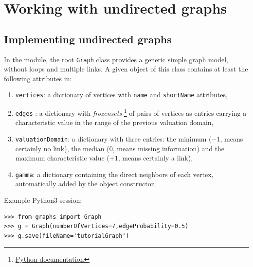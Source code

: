\chapter{Working with undirected graphs}
\label{sec:22}

\abstract*{}

\abstract{}

\section{Implementing undirected graphs}
\label{sec:22.1}

In the  module, the root \texttt{Graph} class provides a generic simple graph model, without loops and multiple links. A given object of this class contains at least the following attributes in:
\begin{enumerate}
\item \texttt{vertices}: a dictionary of vertices with \texttt{name} and \texttt{shortName} attributes,
\item \texttt{edges} : a dictionary with \emph{frozensets} \footnote{\href{https://docs.python.org/3.9/library/stdtypes.html?highlight=frozenset\#frozenset}{Python documentation}} of pairs of vertices as entries carrying a characteristic value in the range of the previous valuation domain,
\item \texttt{valuationDomain}: a dictionary with three entries: the minimum ($-1$, means certainly no link), the median ($0$, means missing information) and the maximum characteristic value ($+1$, means certainly a link),
\item \texttt{gamma}: a dictionary containing the direct neighbors of each vertex, automatically added by the object constructor.
\end{enumerate}

Example Python3 session:
\begin{lstlisting}
>>> from graphs import Graph
>>> g = Graph(numberOfVertices=7,edgeProbability=0.5)
>>> g.save(fileName='tutorialGraph')
\end{lstlisting}

